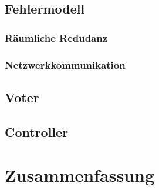 \documentclass[ngerman]{scrartcl}
\begin{document}
\subsection{Fehlermodell} \label{error-model}
\subsubsection{R{\"{a}}umliche Redudanz}
\subsubsection{Netzwerkkommunikation}
\subsection{Voter}
\subsection{Controller}\label{controller}
\section{Zusammenfassung} %
\end{document}
